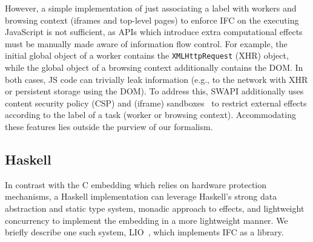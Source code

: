 However, a simple implementation of just associating a label with
workers and browsing context (iframes and top-level pages) to enforce
IFC on the executing JavaScript is not sufficient, as APIs which
introduce extra computational effects must be manually made aware of information flow
control.
%
For example, the initial global object of a worker contains the
\texttt{XMLHttpRequest} (XHR) object, while the global object of a
browsing context additionally contains the DOM.
%
In both cases, JS code can trivially leak information (e.g., to the
network with XHR or persistent storage using the DOM).
%
To address this, SWAPI additionally uses content security policy (CSP) and
(iframe) sandboxes~\cite{csp1.1,html5} to restrict external effects according
to the label of a task (worker or browsing context).  Accommodating these
features lies outside the purview of our formalism.



\subsection{Haskell}
\label{sec:real:hs}
In contrast with the C embedding which relies on hardware protection
mechanisms, a Haskell implementation can leverage Haskell's strong data
abstraction and static type system, monadic approach to effects, and
lightweight concurrency to implement the embedding in a more lightweight
manner.  We briefly describe one such system, LIO~\cite{lio}, which
implements IFC as a library.

